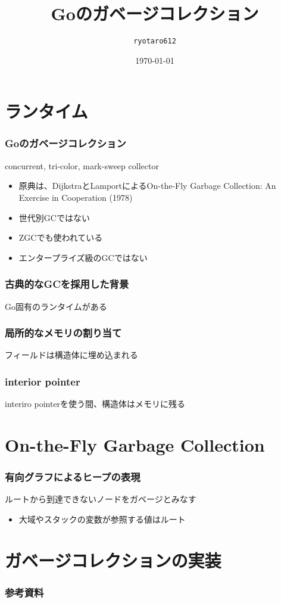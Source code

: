 \documentclass[unicode, 14pt, aspectratio=169]{beamer}
\date{\today}
\title{Goのガベージコレクション}
\author{\texttt{ryotaro612}}
\begin{document}
\begin{frame}
\titlepage
\end{frame}
\section{ランタイム}
\begin{frame}
  \frametitle{Goのガベージコレクション}
  {\large concurrent, tri-color, mark-sweep collector\supercite{go15gc}}
  \begin{itemize}
  \item 原典は、DijkstraとLamportによるOn-the-Fly Garbage Collection: An Exercise in Cooperation (1978)
  \item 世代別GCではない
  \item ZGCでも使われている
  \item エンタープライズ級のGCではない
  \end{itemize}
\end{frame}
\begin{frame}
  \frametitle{古典的なGCを採用した背景}
  {\large Go固有のランタイムがある}
\end{frame}
\begin{frame}
  \frametitle{局所的なメモリの割り当て}
  {\large フィールドは構造体に埋め込まれる}
\end{frame}
\begin{frame}
  \frametitle{interior pointer}
  {\large interiro pointerを使う間、構造体はメモリに残る}
\end{frame}
\section{On-the-Fly Garbage Collection}
\begin{frame}
  \frametitle{有向グラフによるヒープの表現}
  {\large ルートから到達できないノードをガベージとみなす}
  \begin{itemize}
  \item 大域やスタックの変数が参照する値はルート
  \end{itemize}
\end{frame}

\section{ガベージコレクションの実装}
\begin{frame}[allowframebreaks,t]
  \frametitle{参考資料}
  \printbibliography
  \nocite{*}
\end{frame}
\end{document}
